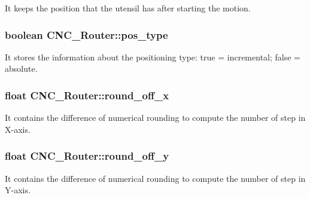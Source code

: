 It keeps the position that the utensil has after starting the motion. 

\hypertarget{class_c_n_c___router_afd35356064c7667cbdf21c44a7dd7cf5}{
\subsubsection[{pos\+\_\+type}]{\setlength{\rightskip}{0pt plus 5cm}boolean C\+N\+C\+\_\+\+Router\+::pos\+\_\+type\hspace{0.3cm}{\ttfamily [private]}}}\label{class_c_n_c___router_afd35356064c7667cbdf21c44a7dd7cf5}


It stores the information about the positioning type\+: true = incremental; false = absolute. 

\hypertarget{class_c_n_c___router_a940f5722a449f52bc29e437dfd6a1909}{
\subsubsection[{round\+\_\+off\+\_\+x}]{\setlength{\rightskip}{0pt plus 5cm}float C\+N\+C\+\_\+\+Router\+::round\+\_\+off\+\_\+x\hspace{0.3cm}{\ttfamily [private]}}}\label{class_c_n_c___router_a940f5722a449f52bc29e437dfd6a1909}


It contains the difference of numerical rounding to compute the number of step in X-\/axis. 

\hypertarget{class_c_n_c___router_a2ac9fcca41eb0791859761fd9a3fd613}{
\subsubsection[{round\+\_\+off\+\_\+y}]{\setlength{\rightskip}{0pt plus 5cm}float C\+N\+C\+\_\+\+Router\+::round\+\_\+off\+\_\+y\hspace{0.3cm}{\ttfamily [private]}}}\label{class_c_n_c___router_a2ac9fcca41eb0791859761fd9a3fd613}


It contains the difference of numerical rounding to compute the number of step in Y-\/axis. 

